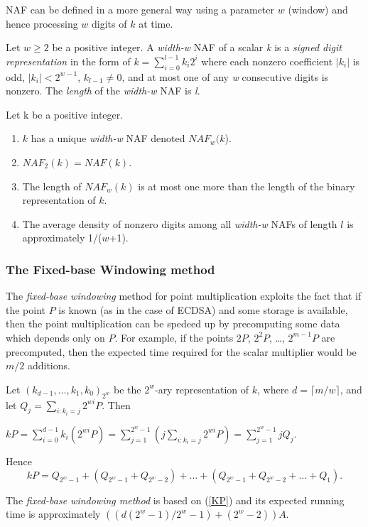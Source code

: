 \documentclass[authoryear]{elsarticle}
\begin{document}
NAF can be defined in a more general way using a parameter $w$ (window) and hence processing $w$ digits of $k$ at time.

Let $w \geq 2$ be a positive integer. A \emph{width-w} NAF of a scalar \emph{k} is a \emph{signed digit representation} in the form of $k = \sum_{i=0}^{l-1} k_i2^i$ where each nonzero coefficient $|k_i|$ is odd, $|k_i| < 2^{w-1}$, $k_{l-1} \neq 0$, and at most one of any \emph{w} consecutive digits is nonzero. The \emph{length} of the \emph{width-w} NAF is \emph{l}.

Let k be a positive integer.
\begin{enumerate}
  \item $k$ has a unique \emph{width-w} NAF denoted $NAF_w(k$).
  \item $NAF_2(k) = NAF(k)$.
  \item The length of $NAF_w(k)$ is at most one more than the length of the binary representation of $k$.
  \item The average density of nonzero digits among all \emph{width-w} NAFs of length $l$ is approximately 1/($w$+1).
\end{enumerate}

\subsubsection{The Fixed-base Windowing method}
The \emph{fixed-base windowing} method for point multiplication exploits the fact that if the point $P$ is known (as in the case of ECDSA) and some storage is available, then the point multiplication can be spedeed up by precomputing some data which depends only on $P$. For example, if the points $2P$, $2^2P$,  \ldots, $2^{m-1}P$ are precomputed, then the expected time required for the scalar multiplier would be $m/2$ additions.

Let $(k_{d-1}, \ldots, k_1, k_0)_{2^w}$ be the $2^w$-ary representation of $k$, where $d=\lceil m/w \rceil$, and let $Q_j = \sum_{i:k_i=j} 2^{wi}P$. Then

\medskip


 $kP = \sum_{i=0}^{d-1}k_i(2^{wi}P) = \sum_{j=1}^{2^w-1}(j\sum_{i:k_i=j}2^{wi}P) = \sum_{j=1}^{2^w-1}jQ_j$.
\medskip

Hence
\begin{equation}\label{KP}
kP = Q_{2^w-1} + (Q_{2^w-1}+Q_{2^w-2}) + \dots + (Q_{2^w-1}+Q_{2^w-2}+\dots+Q_1).
\end{equation}

The \emph{fixed-base windowing method} is based on (\ref{KP}) and its expected running time is approximately $((d(2^w-1)/2^w-1)+(2^w-2))A$.
\end{document}
